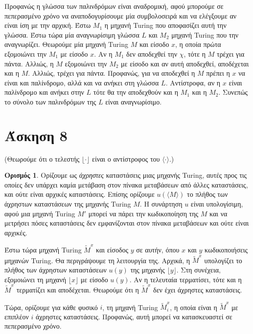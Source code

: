 \documentclass[a4paper, oneside, 11pt]{article}
\theoremstyle{definition}
\newtheorem{defn}[thm]{Ορισμός}
\begin{document}
Προφανώς η γλώσσα των παλινδρόμων είναι αναδρομική, αφού μπορούμε σε πεπερασμένο χρόνο να αναποδογυρίσουμε
μία συμβολοσειρά και να ελέγξουμε αν είναι ίση με την αρχική. Έστω $M_1$ η μηχανή Turing που αποφασίζει
αυτή την γλώσσα.
Έστω τώρα μία αναγνωρίσιμη γλώσσα $L$ και $M_2$ μηχανή Turing που την αναγνωρίζει. 
Θεωρούμε μία μηχανή Turing $Μ$ και είσοδο $x$, η οποία πρώτα εξομοιώνει την $M_1$ με είσοδο $x$. 
Αν η $M_1$ δεν αποδεχθεί
την $χ$, τότε η $M$ τρέχει για πάντα. Αλλιώς, η $M$ εξομοιώνει την $M_2$ με είσοδο και αν αυτή αποδεχθεί,
αποδέχεται και η $M$. Αλλιώς, τρέχει για πάντα. Προφανώς, για να αποδεχθεί η $M$ πρέπει η $x$ να είναι
και παλίνδρομο, αλλά και να ανήκει στη γλώσσα $L$. Αντίστροφα, αν η $x$ είναι παλίνδρομο και ανήκει στην $L$
τότε θα την αποδεχθούν και η $M_1$ και η $M_2$. Συνεπώς το σύνολο των παλινδρόμων της $L$ είναι αναγνωρίσιμο.

\section*{Άσκηση 8}

(Θεωρούμε ότι ο τελεστής $\lfloor\cdot\rfloor$ είναι ο αντίστροφος του $\langle\cdot\rangle$.)

\begin{defn}
Ορίζουμε ως \textit{άχρηστες} καταστάσεις μιας μηχανής Turing, αυτές προς τις οποίες δεν υπάρχει καμία
μετάβαση στον πίνακα μεταβάσεων από άλλες καταστάσεις, 
και ούτε είναι αρχικές καταστάσεις. Επίσης ορίζουμε $u(\langle M\rangle)$ 
το πλήθος των άχρηστων καταστάσεων της μηχανής Turing $M$. Η συνάρτηση $u$ είναι υπολογίσιμη, αφού μια μηχανή
Turing $M'$ μπορεί να πάρει την κωδικοποίηση της $M$ και να μετρήσει πόσες καταστάσεις δεν εμφανίζονται στον
πίνακα μεταβάσεων και ούτε είναι αρχικές.
\end{defn}


Έστω τώρα μηχανή Turing $\widetilde{M}^x$ και είσοδος $y$ σε αυτήν, όπου $x$ και $y$ κωδικοποιήσεις μηχανών
Turing. Θα περιγράψουμε τη λειτουργία της.
Αρχικά, η $\widetilde{M}^x$ υπολογίζει το πλήθος των άχρηστων καταστάσεων $u(y)$ της μηχανής $\lfloor y\rfloor$.
Στη συνέχεια, εξομοιώνει τη μηχανή $\lfloor x\rfloor$ με είσοδο $u(y)$. Αν η τελευταία τερματίσει, τότε και η
$\widetilde{M}^x$ τερματίζει και αποδέχεται. Θεωρούμε ότι η
$\widetilde{M}^x$ δεν έχει άχρηστες καταστάσεις.

Τώρα, ορίζουμε για κάθε φυσικό $i$, τη μηχανή Turing $\widetilde{M}_i^x$, η οποία είναι η $\widetilde{M}^x$
με επιπλέον $i$ άχρηστες καταστάσεις. Προφανώς, αυτή μπορεί να κατασκευαστεί σε πεπερασμένο
χρόνο.
\end{document}
